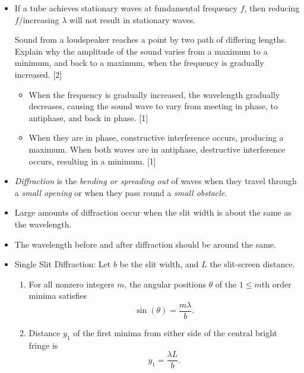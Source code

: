 \documentclass[oneside]{book}
\begin{document}
\begin{itemize}
\begin{example}{}{}
\begin{enumerate}
        \end{enumerate}
    \end{example}
    \item If a tube achieves stationary waves at fundamental frequency \(f\), then reducing \(f\)/increasing \(\lambda\) will not result in stationary waves.
    \begin{example}{}{}
        Sound from a loudspeaker reaches a point by two path of differing lengths. Explain why the amplitude of the sound varies from a maximum to a minimum, and back to a maximum, when the frequency is gradually increased. \hspace*{\fill} [2]
        \begin{itemize}
            \item When the frequency is gradually increased, the wavelength gradually decreases, causing the sound wave to vary from meeting in phase, to antiphase, and back in phase. \hspace*{\fill} [1]
            \item When they are in phase, constructive interference occurs, producing a maximum. When both waves are in antiphase, destructive interference occurs, resulting in a minimum. \hspace*{\fill} [1]
        \end{itemize}
    \end{example}
    \item \emph{Diffraction} is the \emph{bending or spreading out} of waves when they travel through a \emph{small opening} or when they pass round a \emph{small obstacle}.
    \item Large amounts of diffraction occur when the slit width is about the same as the wavelength.
    \item The wavelength before and after diffraction should be around the same.
    \item Single Slit Diffraction: Let \(b\) be the slit width, and \(L\) the slit-screen distance.
    \begin{enumerate}
        \item For all nonzero integers \(m\), the angular positions \(\theta\) of the \(1 \leq m\)th order minima satisfies 
        \[\sin(\theta)=\frac{m\lambda}{b}.\] 
        \item Distance \(y_1\) of the first minima from either side of the central bright fringe is
        \[y_1=\frac{\lambda L}{b}.\]
    \end{enumerate}
    \begin{figure}[H]

\end{figure}
\end{itemize}
\end{document}
